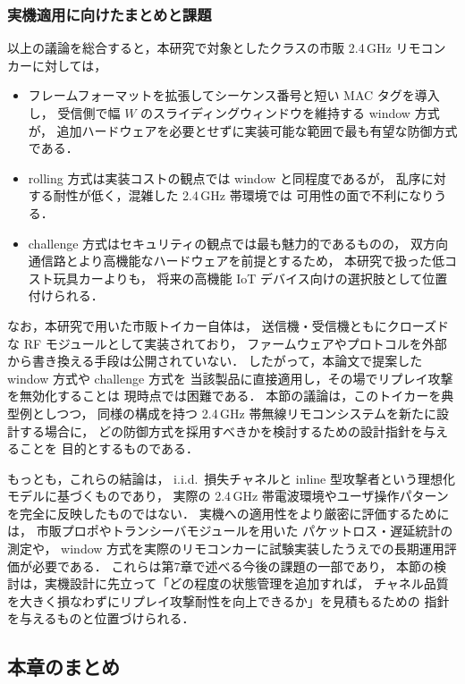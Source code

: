 \documentclass[twocolumn,10pt,a4paper]{jsarticle}
\begin{document}
\subsubsection{実機適用に向けたまとめと課題}

以上の議論を総合すると，本研究で対象としたクラスの市販 2.4\,GHz リモコンカーに対しては，
\begin{itemize}
  \item フレームフォーマットを拡張してシーケンス番号と短い MAC タグを導入し，
        受信側で幅 $W$ のスライディングウィンドウを維持する window 方式が，
        追加ハードウェアを必要とせずに実装可能な範囲で最も有望な防御方式である．
  \item rolling 方式は実装コストの観点では window と同程度であるが，
        乱序に対する耐性が低く，混雑した 2.4\,GHz 帯環境では
        可用性の面で不利になりうる．
  \item challenge 方式はセキュリティの観点では最も魅力的であるものの，
        双方向通信路とより高機能なハードウェアを前提とするため，
        本研究で扱った低コスト玩具カーよりも，
        将来の高機能 IoT デバイス向けの選択肢として位置付けられる．
\end{itemize}

なお，本研究で用いた市販トイカー自体は，
送信機・受信機ともにクローズドな RF モジュールとして実装されており，
ファームウェアやプロトコルを外部から書き換える手段は公開されていない．
したがって，本論文で提案した window 方式や challenge 方式を
当該製品に直接適用し，その場でリプレイ攻撃を無効化することは
現時点では困難である．
本節の議論は，このトイカーを典型例としつつ，
同様の構成を持つ 2.4\,GHz 帯無線リモコンシステムを新たに設計する場合に，
どの防御方式を採用すべきかを検討するための設計指針を与えることを
目的とするものである．

もっとも，これらの結論は，
i.i.d.\ 損失チャネルと inline 型攻撃者という理想化モデルに基づくものであり，
実際の 2.4\,GHz 帯電波環境やユーザ操作パターンを完全に反映したものではない．
実機への適用性をより厳密に評価するためには，
市販プロポやトランシーバモジュール\cite{RC2p4GSlides,TamiyaRCGuide,Nordic_nRF24L01}を用いた
パケットロス・遅延統計の測定や，
window 方式を実際のリモコンカーに試験実装したうえでの長期運用評価が必要である．
これらは第7章で述べる今後の課題の一部であり，
本節の検討は，実機設計に先立って「どの程度の状態管理を追加すれば，
チャネル品質を大きく損なわずにリプレイ攻撃耐性を向上できるか」を見積もるための
指針を与えるものと位置づけられる．

\subsection{本章のまとめ}
\end{document}

